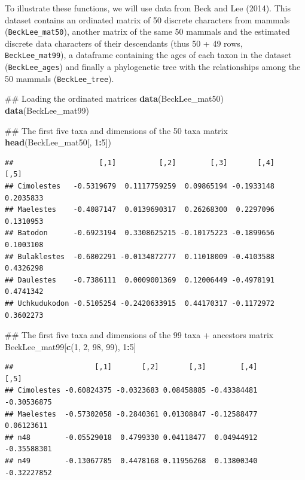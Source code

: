 \documentclass[]{book}
\newenvironment{Shaded}{\begin{snugshade}}{\end{snugshade}}
\newcommand{\KeywordTok}[1]{\textcolor[rgb]{0.13,0.29,0.53}{\textbf{#1}}}
\newcommand{\DecValTok}[1]{\textcolor[rgb]{0.00,0.00,0.81}{#1}}
\newcommand{\OperatorTok}[1]{\textcolor[rgb]{0.81,0.36,0.00}{\textbf{#1}}}
\newcommand{\NormalTok}[1]{#1}
\theoremstyle{definition}
\theoremstyle{definition}
\theoremstyle{remark}
\begin{document}
To illustrate these functions, we will use data from Beck and Lee
(2014). This dataset contains an ordinated matrix of 50 discrete
characters from mammals (\texttt{BeckLee\_mat50}), another matrix of the
same 50 mammals and the estimated discrete data characters of their
descendants (thus 50 + 49 rows, \texttt{BeckLee\_mat99}), a dataframe
containing the ages of each taxon in the dataset
(\texttt{BeckLee\_ages}) and finally a phylogenetic tree with the
relationships among the 50 mammals (\texttt{BeckLee\_tree}).

\begin{Shaded}
\begin{Highlighting}[]
\NormalTok{## Loading the ordinated matrices}
\KeywordTok{data}\NormalTok{(BeckLee_mat50)}
\KeywordTok{data}\NormalTok{(BeckLee_mat99)}

\NormalTok{## The first five taxa and dimensions of the 50 taxa matrix}
\KeywordTok{head}\NormalTok{(BeckLee_mat50[, }\DecValTok{1}\OperatorTok{:}\DecValTok{5}\NormalTok{])}
\end{Highlighting}
\end{Shaded}

\begin{verbatim}
##                    [,1]          [,2]        [,3]       [,4]      [,5]
## Cimolestes   -0.5319679  0.1117759259  0.09865194 -0.1933148 0.2035833
## Maelestes    -0.4087147  0.0139690317  0.26268300  0.2297096 0.1310953
## Batodon      -0.6923194  0.3308625215 -0.10175223 -0.1899656 0.1003108
## Bulaklestes  -0.6802291 -0.0134872777  0.11018009 -0.4103588 0.4326298
## Daulestes    -0.7386111  0.0009001369  0.12006449 -0.4978191 0.4741342
## Uchkudukodon -0.5105254 -0.2420633915  0.44170317 -0.1172972 0.3602273
\end{verbatim}

\begin{Shaded}
\begin{Highlighting}[]
\NormalTok{## The first five taxa and dimensions of the 99 taxa + ancestors matrix}
\NormalTok{BeckLee_mat99[}\KeywordTok{c}\NormalTok{(}\DecValTok{1}\NormalTok{, }\DecValTok{2}\NormalTok{, }\DecValTok{98}\NormalTok{, }\DecValTok{99}\NormalTok{), }\DecValTok{1}\OperatorTok{:}\DecValTok{5}\NormalTok{]}
\end{Highlighting}
\end{Shaded}

\begin{verbatim}
##                   [,1]       [,2]       [,3]        [,4]        [,5]
## Cimolestes -0.60824375 -0.0323683 0.08458885 -0.43384481 -0.30536875
## Maelestes  -0.57302058 -0.2840361 0.01308847 -0.12588477  0.06123611
## n48        -0.05529018  0.4799330 0.04118477  0.04944912 -0.35588301
## n49        -0.13067785  0.4478168 0.11956268  0.13800340 -0.32227852
\end{verbatim}
\end{document}
